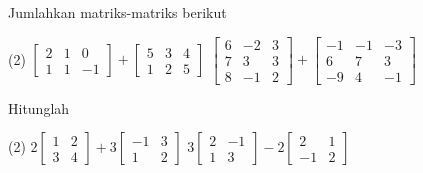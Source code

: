 \begin{exercise}
Jumlahkan matriks-matriks berikut
\begin{tasks}(2)
\task
$\begin{bmatrix}
2 & 1 & 0 \\
1 & 1 & -1
\end{bmatrix}
+
\begin{bmatrix}
5 & 3 & 4 \\
1 & 2 & 5
\end{bmatrix}$
\task
$\begin{bmatrix}
6 & -2 & 3 \\
7 & 3 & 3 \\
8 & -1 & 2
\end{bmatrix}
+
\begin{bmatrix}
-1 & -1 & -3 \\
6 & 7 & 3 \\
-9 & 4 & -1
\end{bmatrix}$
\end{tasks}
\end{exercise}

\begin{exercise}
Hitunglah
\begin{tasks}(2)
\task
$2\begin{bmatrix}
1 & 2 \\
3 & 4
\end{bmatrix}
+
3
\begin{bmatrix}
-1 & 3 \\
1 & 2
\end{bmatrix}$
\task
$3\begin{bmatrix}
2 & -1 \\
1 & 3
\end{bmatrix}
-
2
\begin{bmatrix}
2 & 1 \\
-1 & 2
\end{bmatrix}$
\end{tasks}
\end{exercise}

